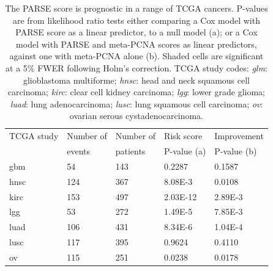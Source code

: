 \documentclass[dissertation.tex]{subfiles}
\begin{document}
\begin{table}[h]
\centering
\caption[\acrshort{PARSE} score is prognostic in a range of \acrshort{TCGA} cancers]{The \acrshort{PARSE} score is prognostic in a range of \acrshort{TCGA} cancers.  P-values are from likelihood ratio tests either comparing a Cox model with \acrshort{PARSE} score as a linear predictor, to a null model (a); or a Cox model with \acrshort{PARSE} and meta-PCNA scores as linear predictors, against one with meta-PCNA alone (b).  Shaded cells are significant at a 5\% \acrshort{FWER} following Holm's correction.  \acrshort{TCGA} study codes: \emph{glm}: glioblastoma multiforme; \emph{hnsc}: head and neck squamous cell carcinoma; \emph{kirc}: clear cell kidney carcinoma; \emph{lgg}: lower grade glioma; \emph{luad}: lung adenocarcinoma; \emph{lusc}: lung squamous cell carcinoma; \emph{ov}: ovarian serous cystadenocarcinoma.}\label{tab:sigs-validation-tcga}
\begin{tabular}{@{}lllll@{}}
\toprule
TCGA study & Number of & Number of & Risk score  & Improvement \\
           & events    & patients  & P-value (a) & P-value (b) \\ \midrule
gbm    & 54   & 143    & 0.2287                           & 0.1587                           \\
hnsc   & 124  & 367    & \cellcolor[HTML]{C0C0C0}8.08E-3  & 0.0108                           \\
kirc   & 153  & 497    & \cellcolor[HTML]{C0C0C0}2.03E-12 & \cellcolor[HTML]{C0C0C0}2.89E-3  \\
lgg    & 53   & 272    & \cellcolor[HTML]{C0C0C0}1.49E-5  & \cellcolor[HTML]{C0C0C0}7.85E-3  \\
luad   & 106  & 431    & \cellcolor[HTML]{C0C0C0}8.34E-6  & \cellcolor[HTML]{C0C0C0}1.04E-4  \\
lusc   & 117  & 395    & 0.9624                           & 0.4110                           \\
ov     & 115  & 251    & 0.0238                           & 0.0178                           \\ \bottomrule
\end{tabular}
\end{table}
\end{document}
